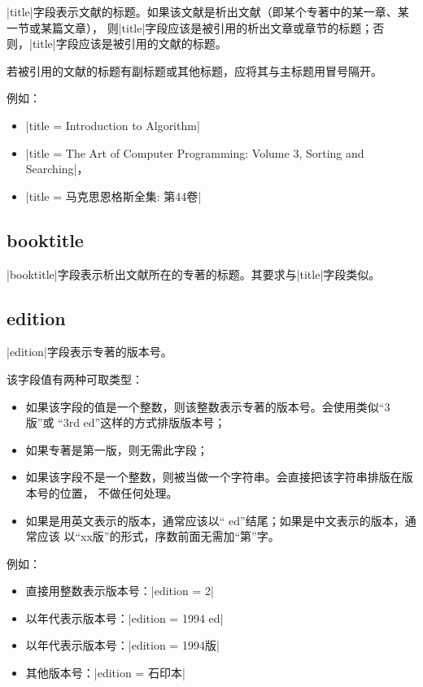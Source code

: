 |title|字段表示文献的标题。如果该文献是析出文献（即某个专著中的某一章、某一节或某篇文章），
则|title|字段应该是被引用的析出文章或章节的标题；否则，|title|字段应该是被引用的文献的标题。

若被引用的文献的标题有副标题或其他标题，应将其与主标题用冒号隔开。

例如：
\begin{itemize}
\item |title = {Introduction to Algorithm}|
\item |title = {The Art of Computer Programming: Volume 3, Sorting and Searching}|，
\item |title = {马克思恩格斯全集: 第44卷}|
\end{itemize}

\subsection{booktitle}\label{subsec:bibfield-booktitle}

|booktitle|字段表示析出文献所在的专著的标题。其要求与|title|字段类似。

\subsection{edition}\label{subsec:bibfield-edition}

|edition|字段表示专著的版本号。

该字段值有两种可取类型：
\begin{itemize}
\item 如果该字段的值是一个整数，则该整数表示专著的版本号。{\BibTeX}会使用类似``3版''或
``3rd ed''这样的方式排版版本号；
\item 如果专著是第一版，则无需此字段；
\item 如果该字段不是一个整数，则被当做一个字符串。{\BibTeX}会直接把该字符串排版在版本号的位置，
不做任何处理。
\item 如果是用英文表示的版本，通常应该以`` ed''结尾；如果是中文表示的版本，通常应该
以``xx版''的形式，序数前面无需加``第''字。
\end{itemize}

例如：
\begin{itemize}
\item 直接用整数表示版本号：|edition = {2}|
\item 以年代表示版本号：|edition = {1994 ed}|
\item 以年代表示版本号：|edition = {1994版}|
\item 其他版本号：|edition = {石印本}|
\end{itemize}

